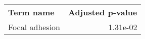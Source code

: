 \begin{tabular}{lr}
\toprule
     Term name &  Adjusted p-value \\
\midrule
Focal adhesion &          1.31e-02 \\
\bottomrule
\end{tabular}
